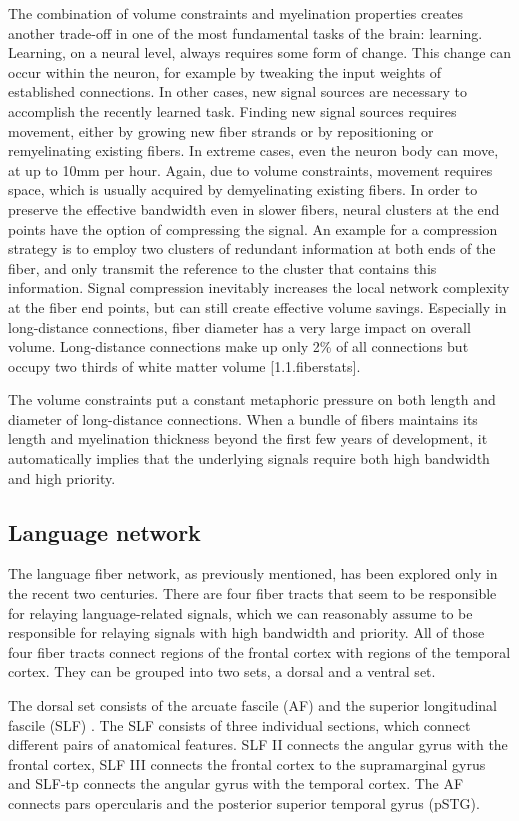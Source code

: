 The combination of volume constraints and myelination properties creates another trade-off in one of the most fundamental tasks of the brain: learning.
Learning, on a neural level, always requires some form of change.
This change can occur within the neuron, for example by tweaking the input weights of established connections.
In other cases, new signal sources are necessary to accomplish the recently learned task.
Finding new signal sources requires movement, either by growing new fiber strands or by repositioning or remyelinating existing fibers.
In extreme cases, even the neuron body can move, at up to 10mm per hour.
Again, due to volume constraints, movement requires space, which is usually acquired by demyelinating existing fibers.
In order to preserve the effective bandwidth even in slower fibers, neural clusters at the end points have the option of compressing the signal.
An example for a compression strategy is to employ two clusters of redundant information at both ends of the fiber, and only transmit the reference to the cluster that contains this information.
Signal compression inevitably increases the local network complexity at the fiber end points, but can still create effective volume savings.
Especially in long-distance connections, fiber diameter has a very large impact on overall volume.
Long-distance connections make up only 2\% of all connections but occupy two thirds of white matter volume [1.1.fiberstats].

The volume constraints put a constant metaphoric pressure on both length and diameter of long-distance connections.
When a bundle of fibers maintains its length and myelination thickness beyond the first few years of development, it automatically implies that the underlying signals require both high bandwidth and high priority.

\subsection{Language network}
The language fiber network, as previously mentioned, has been explored only in the recent two centuries.
There are four fiber tracts that seem to be responsible for relaying language-related signals, which we can reasonably assume to be responsible for relaying signals with high bandwidth and priority.
All of those four fiber tracts connect regions of the frontal cortex with regions of the temporal cortex.
They can be grouped into two sets, a dorsal and a ventral set.

The dorsal set consists of the arcuate fascile (AF) and the superior longitudinal fascile (SLF) \cite{1.1.Gierhan}.
The SLF consists of three individual sections, which connect different pairs of anatomical features.
SLF II connects the angular gyrus with the frontal cortex, SLF III connects the frontal cortex to the supramarginal gyrus and SLF-tp connects the angular gyrus with the temporal cortex.
The AF connects pars opercularis and the posterior superior temporal gyrus (pSTG).


